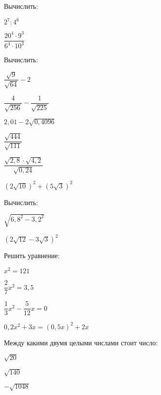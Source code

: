 \begin{listofex}
	\item Вычислить:
	\begin{enumcols}[itemcolumns=3]
		\item \( 2^7:4^6 \)
		\item \( \dfrac{20^4\cdot9^3}{6^4\cdot10^3} \)
		\item {}
	\end{enumcols}
	\item Вычислить:
	\begin{enumcols}[itemcolumns=3]
		\item \( \dfrac{\sqrt{9}}{\sqrt{64}}-2 \)
		\item \( \dfrac{4}{\sqrt{256}}-\dfrac{1}{\sqrt{225}} \)
		\item \( 2,01-2\sqrt{0,4096} \)
		\item \( \dfrac{\sqrt{444}}{\sqrt{111}} \)
		\item \( \dfrac{\sqrt{2,8}\cdot\sqrt{4,2}}{\sqrt{0,24}} \)
		\item \( (2\sqrt{10})^2+(5\sqrt{3})^2 \)
	\end{enumcols}
	\item Вычислить:
	\begin{enumcols}[itemcolumns=2]
		\item \( \sqrt{6,8^2-3,2^2} \)
		\item \( (2\sqrt{12}-3\sqrt{3})^2 \)
	\end{enumcols}
	\item {}
	\item {}
	\item Решить уравнение:
	\begin{enumcols}[itemcolumns=2]
		\item \( x^2=121 \)
		\item \( \dfrac{2}{7}x^2=3,5 \)
		\item \( \dfrac{1}{3}x^2-\dfrac{5}{12}x=0 \)
		\item \( 0,2x^2+3x=(0,5x)^2+2x \)
	\end{enumcols}
	\item {}
		\item Между какими двумя целыми числами стоит число:
	\begin{enumcols}[itemcolumns=3]
		\item \( \sqrt{20} \)
		\item \( \sqrt{140} \)
		\item \( -\sqrt{1048} \)
	\end{enumcols}
\end{listofex}
